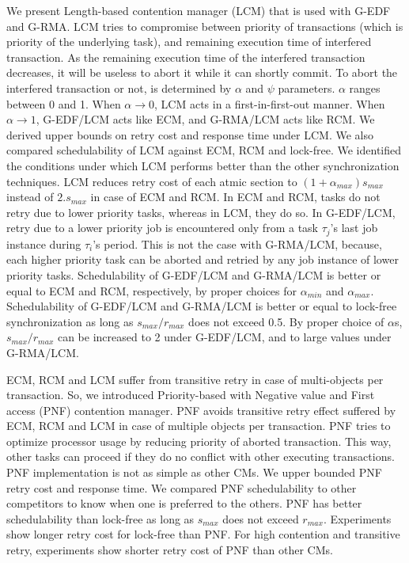 \documentclass[12pt,english]{report}
\begin{document}
We present Length-based contention manager (LCM) that is used with G-EDF and G-RMA. LCM tries to compromise between priority of transactions (which is priority of the underlying task), and remaining execution time of interfered transaction. As the remaining execution time of the interfered transaction decreases, it will be useless to abort it while it can shortly commit. To abort the interfered transaction or not, is determined by $\alpha$ and $\psi$ parameters. $\alpha$ ranges between 0 and 1. When $\alpha \rightarrow 0$, LCM acts in a first-in-first-out manner. When $\alpha\rightarrow1$, G-EDF/LCM acts like ECM, and G-RMA/LCM acts like RCM. We derived upper bounds on retry cost and response time under LCM. We also compared schedulability of LCM against ECM, RCM and lock-free. We identified the conditions under which LCM performs better than the other synchronization techniques. LCM reduces retry cost  of each atmic section to $(1+\alpha_{max})s_{max}$ instead of $2.s_{max}$ in case of ECM and RCM. In ECM and RCM, tasks do not retry due to lower priority tasks, whereas in LCM, they do so. In G-EDF/LCM, retry due to a lower priority job is encountered only from a task $\tau_{j}$'s last job instance during $\tau_{i}$'s period. This is not the case with G-RMA/LCM, because,  each higher priority task can be aborted and retried by any job instance of lower priority tasks. Schedulability of G-EDF/LCM and G-RMA/LCM is better or equal to ECM and RCM, respectively, by proper choices for $\alpha_{min}$ and $\alpha_{max}$. Schedulability of G-EDF/LCM and G-RMA/LCM is better or equal to lock-free synchronization as long as $s_{max}/r_{max}$ does not exceed 0.5. By proper choice of $\alpha$s, $s_{max}/r_{max}$ can be increased to 2 under G-EDF/LCM, and to large values under G-RMA/LCM.

ECM, RCM and LCM suffer from transitive retry in case of multi-objects per transaction. So, we introduced Priority-based with Negative value and First access (PNF) contention manager. PNF avoids transitive retry effect suffered by ECM, RCM and LCM in case of multiple objects per transaction. PNF tries to optimize processor usage by reducing priority of aborted transaction. This way, other tasks can proceed if they do no conflict with other executing transactions. PNF implementation is not as simple as other CMs.
We upper bounded PNF retry cost and response time. We compared PNF schedulability to other competitors to know when one is preferred to the others. PNF has better schedulability than lock-free as long as $s_{max}$ does not exceed $r_{max}$. Experiments show longer retry cost for lock-free than PNF. For high contention and transitive retry, experiments show shorter retry cost of PNF than other CMs.
\end{document}
